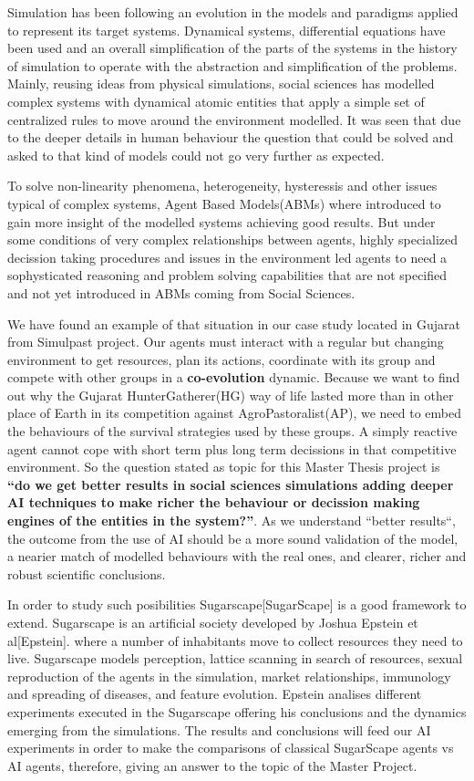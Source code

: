 \documentclass{report}
\begin{document}
Simulation has been following an evolution in the models and paradigms applied to represent its target
systems. Dynamical systems, differential equations have been used and an overall simplification of the parts of the systems in the history of simulation to operate with the abstraction and simplification of the problems.
Mainly, reusing ideas from physical simulations, social sciences has modelled complex systems with dynamical
atomic entities that apply a simple set of centralized rules to move around the environment modelled. It was seen that due to the deeper details in human behaviour the question that could be solved and asked to that kind of models could not go very further as expected. 

To solve non-linearity phenomena, heterogeneity, hysteressis and other issues typical of complex systems, Agent Based Models(ABMs) where introduced to gain more insight of the modelled systems achieving good results. But under 
some conditions of very complex relationships between agents, highly specialized decission taking procedures
and issues in the environment led agents to need a sophysticated reasoning and problem solving capabilities
that are not specified and not yet introduced in ABMs coming from Social Sciences. 

We have found an example of that situation in our case study located in Gujarat from Simulpast project. Our agents must interact with a regular but changing environment to get resources, plan its actions, coordinate with its group and compete with other groups in a \textbf{co-evolution} dynamic. Because we want to find out why the Gujarat HunterGatherer(HG) way of life lasted more than in other place of Earth in its competition against AgroPastoralist(AP), we need to embed the behaviours of the survival strategies used by these groups. A simply reactive agent cannot cope with short term plus long term decissions in that competitive environment. So the question stated as topic for this Master Thesis project is \textbf{``do we get better results in social sciences simulations adding deeper AI techniques to make richer the behaviour or decission making engines of the entities in the system?''}. As we understand ``better results``, the outcome from the use of AI should be a more sound validation of the model, a nearier match of modelled behaviours with the real ones, and clearer, richer and robust scientific conclusions.

In order to study such posibilities Sugarscape[SugarScape] is a good framework to extend. Sugarscape is an artificial society developed by Joshua Epstein et al[Epstein]. where a number of inhabitants move to collect resources they need to live. Sugarscape models perception, lattice scanning in search of resources, sexual reproduction of the agents in the simulation, market relationships, immunology and spreading of diseases, and feature evolution. Epstein analises different experiments executed in the Sugarscape offering his conclusions and the dynamics emerging from the simulations. The results and conclusions will feed our AI experiments in order to make the comparisons of classical SugarScape agents vs AI agents, therefore, giving an answer to the topic of the Master Project.
\end{document}

